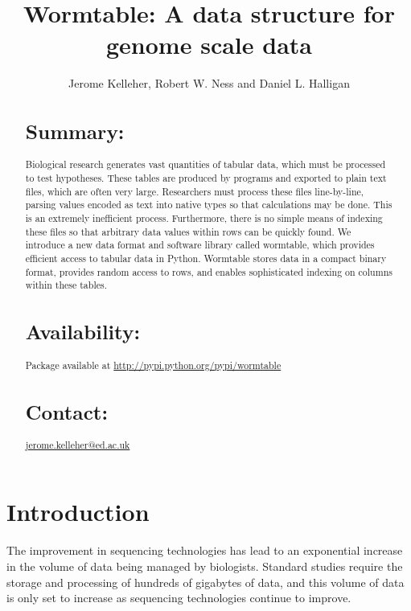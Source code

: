 \documentclass{bioinfo}
\begin{document}

\title[Wormtable]{Wormtable: A data structure for genome scale data}
\author[Kelleher \textit{et~al}]{Jerome Kelleher, Robert W. Ness 
and Daniel L. Halligan}
\address{
University of Edinburgh,
King's Buildings,
West Mains Road,
EH9 3JT,
UK
}



\maketitle

\begin{abstract}
\section{Summary:}
Biological research generates vast quantities of tabular data, which must 
be processed to test hypotheses. These tables are produced by 
programs and exported to plain text files, which are often very large. 
Researchers must process these files 
line-by-line, parsing values encoded as text into native types so that 
calculations may be done. This is an extremely inefficient process.
Furthermore, there is no simple means of indexing these files so that 
arbitrary data values within rows can be quickly found. We introduce a new 
data format and software library called wormtable, which provides efficient 
access to tabular data in Python. Wormtable stores data in a compact
binary format, provides random access to rows, and enables sophisticated
indexing on columns within these tables.
\section{Availability:}
Package available at 
\href{http://pypi.python.org/pypi/wormtable}{http://pypi.python.org/pypi/wormtable}

\section{Contact:} \href{jerome.kelleher@ed.ac.uk}{jerome.kelleher@ed.ac.uk}
\end{abstract}

\section{Introduction}
The improvement in sequencing technologies has
lead to an exponential increase in the volume of data being managed 
by biologists. Standard studies require the storage and processing 
of hundreds of gigabytes of data, and this volume of data is only set to 
increase as sequencing technologies continue to improve.
\end{document}
